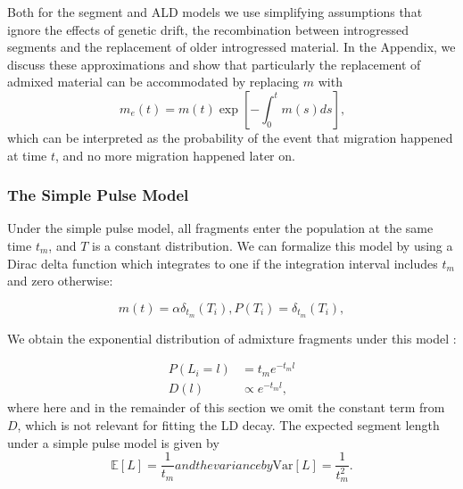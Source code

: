 \documentclass[11pt]{article}
\begin{document}
Both for the segment and ALD models we use simplifying assumptions that ignore the effects of genetic drift,  the recombination between introgressed segments and the replacement of older introgressed material. In the Appendix, we discuss these approximations and show that particularly the replacement of admixed material can be accommodated by replacing $m$ with
\begin{equation}
    m_e(t) = m(t)\exp\left[-\int_0^t m(s)ds\right] \text{,} \label{eq:effective_migration}
\end{equation}
which can be interpreted as the probability of the event that migration happened at time $t$, and no more migration happened later on.



\subsubsection{The Simple Pulse Model}\label{The Simple Pulse Model}
	
	
Under the simple pulse model, all fragments enter the population at the same time $t_m$, and $T$ is a constant distribution. We can formalize this model by using a Dirac delta function which integrates to one if the integration interval includes $t_m$ and zero otherwise:

\begin{subequations}
\begin{equation}
\label{eq:RV_simple_pulse_1}
	m(t)=  \alpha \delta_{t_m}(T_i),
\end{equation} 
	
\begin{equation}
\label{eq:RV_simple_pulse_2}
	P(T_i)=\delta_{t_m}(T_i),
\end{equation} 
\end{subequations}


	
We obtain the exponential distribution of admixture fragments under this model \citep[e.g.][]{moorjani_history_2011}:

\begin{subequations}
\begin{align}
\label{eq:Likelihood_function_simple_pulse}
	P(L_i=l) &= t_me^{-t_m l}\\
	D(l) &\propto e^{-t_m l},
\end{align}
\end{subequations}	
where here and in the remainder of this section we omit the constant term from $D$, which is not relevant for fitting the LD decay. The expected segment length under a simple pulse model is given by
\begin{subequations}

\begin{equation}
\label{eq:Expected_l_simple_pulse}
\mathbb{E}[L]=\frac{1}{t_m}
\end{equation}
	
and the variance by
\begin{equation}
\label{eq:Expected_v_simple_pulse}
\text{Var}[L]=\frac{1}{t_m^2} \text{.}
\end{equation}
\end{subequations}	
\end{document}
